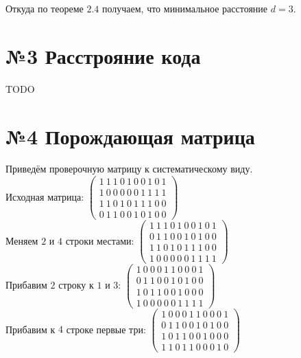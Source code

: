 \documentclass[fontsize=14pt]{article}
\begin{document}
Откуда по теореме $2.4$ получаем, что минимальное расстояние $d = 3$.

\section*{№3 Расстрояние кода}

TODO

\section*{№4 Порождающая матрица}
	Приведём проверочную матрицу к систематическому виду.\\
	Исходная матрица: 
	$
	 \begin{pmatrix}
		1\ 1\ 1\ 0\ 1\ 0\ 0\ 1\ 0\ 1\\
		1\ 0\ 0\ 0\ 0\ 0\ 1\ 1\ 1\ 1\\
		1\ 1\ 0\ 1\ 0\ 1\ 1\ 1\ 0\ 0\\
		0\ 1\ 1\ 0\ 0\ 1\ 0\ 1\ 0\ 0
	\end{pmatrix}
	$\\
	
	Меняем $2$ и $4$ строки местами:
	 $
	 \begin{pmatrix}
		1\ 1\ 1\ 0\ 1\ 0\ 0\ 1\ 0\ 1\\
		0\ 1\ 1\ 0\ 0\ 1\ 0\ 1\ 0\ 0\\
		1\ 1\ 0\ 1\ 0\ 1\ 1\ 1\ 0\ 0\\
		1\ 0\ 0\ 0\ 0\ 0\ 1\ 1\ 1\ 1		
	\end{pmatrix}
	$\\
	
	Прибавим $2$ строку к $1$ и $3$: 
	$
	 \begin{pmatrix}
		1\ 0\ 0\ 0\ 1\ 1\ 0\ 0\ 0\ 1\\
		0\ 1\ 1\ 0\ 0\ 1\ 0\ 1\ 0\ 0\\
		1\ 0\ 1\ 1\ 0\ 0\ 1\ 0\ 0\ 0\\
		1\ 0\ 0\ 0\ 0\ 0\ 1\ 1\ 1\ 1		
	\end{pmatrix}
	$\\

	Прибавим к $4$ строке первые три:
	$
	 \begin{pmatrix}
		1\ 0\ 0\ 0\ 1\ 1\ 0\ 0\ 0\ 1\\
		0\ 1\ 1\ 0\ 0\ 1\ 0\ 1\ 0\ 0\\
		1\ 0\ 1\ 1\ 0\ 0\ 1\ 0\ 0\ 0\\
		1\ 1\ 0\ 1\ 1\ 0\ 0\ 0\ 1\ 0		
	\end{pmatrix}
	$\\
	
\end{document}
